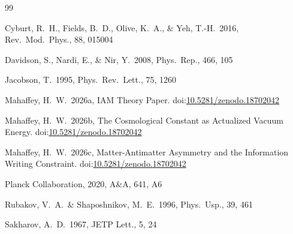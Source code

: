 \documentclass[12pt,a4paper]{article}
\begin{document}

\begin{thebibliography}{99}

Cyburt, R.\ H., Fields, B.\ D., Olive, K.\ A., \& Yeh, T.-H.\ 2016,
Rev.\ Mod.\ Phys., 88, 015004

Davidson, S., Nardi, E., \& Nir, Y.\ 2008, Phys.\ Rep., 466, 105

Jacobson, T.\ 1995, Phys.\ Rev.\ Lett., 75, 1260

Mahaffey, H.\ W.\ 2026a, IAM Theory Paper.
doi:\href{https://doi.org/10.5281/zenodo.18702042}{10.5281/zenodo.18702042}

Mahaffey, H.\ W.\ 2026b, The Cosmological Constant as Actualized
Vacuum Energy.
doi:\href{https://doi.org/10.5281/zenodo.18702042}{10.5281/zenodo.18702042}

Mahaffey, H.\ W.\ 2026c, Matter-Antimatter Asymmetry and the
Information Writing Constraint.
doi:\href{https://doi.org/10.5281/zenodo.18702042}{10.5281/zenodo.18702042}

Planck Collaboration, 2020, A\&A, 641, A6

Rubakov, V.\ A.\ \& Shaposhnikov, M.\ E.\ 1996,
Phys.\ Usp., 39, 461

Sakharov, A.\ D.\ 1967, JETP Lett., 5, 24

\end{thebibliography}
\end{document}
